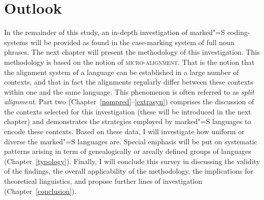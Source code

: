 \section{Outlook}\label{outline}

In the remainder of this study, an in-depth investigation of marked"=S coding-systems will be provided as found in the case-marking system of full noun phra\-ses.
The next chapter will present the methodology of this investigation. 
This methodology is based on the notion of \textsc{micro-alignment}. 
That is the notion that the alignment system of a language can be established in a large number of contexts, and that in fact the alignments regularly differ between these contexts within one and the same language. This phenomenon is often referred to as \textit{split alignment}.
Part two (Chapter~\ref{nompred}--\ref{extrasyn}) comprises the discussion of the contexts selected for this investigation (these will be introduced in the next chapter) and demonstrates the strategies employed by marked"=S languages to encode these contexts.
Based on these data, I will investigate how uniform or diverse the marked"=S languages are. 
Special emphasis will be put on systematic patterns arising in term of genealogically or areally defined groups of languages (Chapter~\ref{typology}).
Finally, I will conclude this survey in discussing the validity of the findings, the overall applicability of the methodology, the implications for theoretical linguistics, and propose further lines of investigation (Chapter~\ref{conclusion}).     


 

